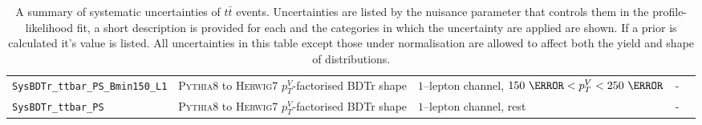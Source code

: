 \begin{table}[hbpt!]
{\begin{tabular}{lllll}
      \texttt{SysBDTr\_ttbar\_PS\_Bmin150\_L1} & \textsc{Pythia8} to \textsc{Herwig7} $p_T^V$-factorised BDTr shape  & $1$--lepton channel, $150~\GeV< p_T^V <250~\GeV$ & - \\
      \texttt{SysBDTr\_ttbar\_PS} & \textsc{Pythia8} to \textsc{Herwig7} $p_T^V$-factorised BDTr shape  & $1$--lepton channel, rest & - \\
      \bottomrule
    \end{tabular}
  }
  \caption[A summary of systematic uncertainties on $t\bar{t}$ events.]{A
    summary of systematic uncertainties of $t\bar{t}$ events. Uncertainties are
    listed by the nuisance parameter that controls them in the profile-likelihood
    fit, a short description is provided for each and the categories in which the
    uncertainty are applied are shown. If a prior is calculated it's value is
    listed. All uncertainties in this table except those under normalisation are
    allowed to affect both the yield and shape of distributions.}
  \label{tab:ttbar-systs}
\end{table}